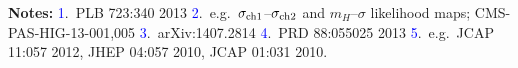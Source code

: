 \documentclass[11pt,oneside,twocolumn,a4paper]{article}
\begin{document}
\vspace{3.1mm}\noindent\textbf{Notes:} \textcolor{blue}{1}.\ PLB 723:340 2013 \textcolor{blue}{2}.\ e.g.\ $\sigma_{\rm ch1}$--$\sigma_{\rm ch2}$ and $m_H$--$\sigma$ likelihood maps; CMS-PAS-HIG-13-001,005 \textcolor{blue}{3}.\ arXiv:1407.2814 \textcolor{blue}{4}.\ PRD 88:055025 2013 \textcolor{blue}{5}.\ e.g.\ JCAP 11:057 2012, JHEP 04:057 2010, JCAP 01:031 2010.
\end{document}
